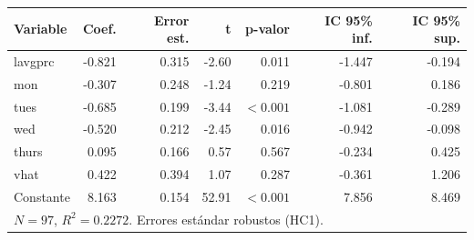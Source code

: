 
\begin{tabular}{lrrrrrr}
\toprule
Variable & Coef. & Error est. & t & p-valor & IC 95\% inf. & IC 95\% sup.\\
\midrule
lavgprc & -0.821 & 0.315 & -2.60 & 0.011 & -1.447 & -0.194\\
mon & -0.307 & 0.248 & -1.24 & 0.219 & -0.801 & 0.186\\
tues & -0.685 & 0.199 & -3.44 & $<0.001$ & -1.081 & -0.289\\
wed & -0.520 & 0.212 & -2.45 & 0.016 & -0.942 & -0.098\\
thurs & 0.095 & 0.166 & 0.57 & 0.567 & -0.234 & 0.425\\
vhat & 0.422 & 0.394 & 1.07 & 0.287 & -0.361 & 1.206\\
Constante & 8.163 & 0.154 & 52.91 & $<0.001$ & 7.856 & 8.469\\
\midrule
\multicolumn{7}{l}{$N=97$, $R^2=0.2272$. Errores estándar robustos (HC1).}\\
\bottomrule
\end{tabular}
